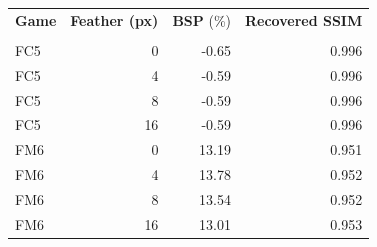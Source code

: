 \begin{tabular}{@{}lrrr@{}}
\toprule
\textbf{Game} & \textbf{Feather (px)} & \textbf{BSP} (\%) & \textbf{Recovered SSIM} \\\\
\midrule
FC5 & 0 & -0.65 & 0.996 \\
FC5 & 4 & -0.59 & 0.996 \\
FC5 & 8 & -0.59 & 0.996 \\
FC5 & 16 & -0.59 & 0.996 \\
\midrule
FM6 & 0 & 13.19 & 0.951 \\
FM6 & 4 & 13.78 & 0.952 \\
FM6 & 8 & 13.54 & 0.952 \\
FM6 & 16 & 13.01 & 0.953 \\
\bottomrule
\end{tabular}
